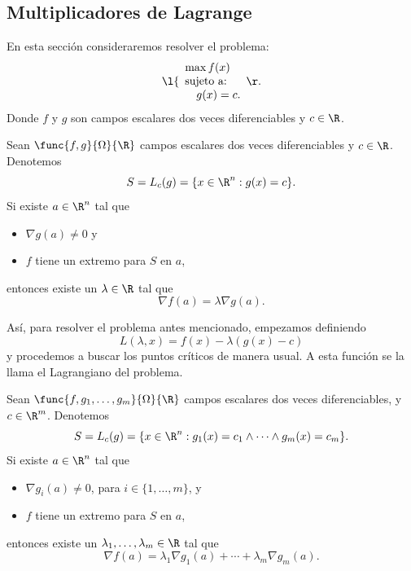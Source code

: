 \documentclass[a4,11pt]{aleph-notas}
\begin{document}
\subsection{Multiplicadores de Lagrange}

En esta sección consideraremos resolver el problema:
\[
    \l\{
    \begin{array}{l}
         \max f(x) \\
         \text{sujeto a:}\\
         \quad g(x)=c.
    \end{array}\r.
\]
Donde $f$ y $g$ son campos escalares dos veces diferenciables y $c\in\R$.
 

\begin{teo}
    Sean $\func{f,g}{\Omega}{\R}$ campos escalares dos veces diferenciables y $c\in \R$. Denotemos 
    \[
        S = L_c(g) = \{x\in \R^n: g(x)=c\}.
    \]
    Si existe $a\in\R^n$ tal que
    \begin{itemize}
        \item $\nabla g(a) \neq 0$ y
        \item $f$ tiene un extremo para $S$ en $a$,
    \end{itemize}
    entonces existe un $\lambda\in\R$ tal que
    \[
        \nabla f(a) = \lambda \nabla g(a).
    \]
\end{teo}
 

Así, para resolver el problema antes mencionado, empezamos definiendo
\[
    L(\lambda,x) = f(x) - \lambda (g(x)-c)
\]
y procedemos a buscar los puntos críticos de manera usual. A esta función se la llama el Lagrangiano del problema.
 

\begin{teo}
    Sean $\func{f,g_1,\ldots,g_m}{\Omega}{\R}$ campos escalares dos veces diferenciables, y $c\in \R^m$. Denotemos 
    \[
        S = L_c(g) = \{x\in \R^n: g_1(x)=c_1\land\cdots\land g_m(x)=c_m\}.
    \]
    Si existe $a\in\R^n$ tal que
    \begin{itemize}
        \item $\nabla g_i(a) \neq 0$, para $i\in\{1,\ldots,m\}$, y
        \item $f$ tiene un extremo para $S$ en $a$,
    \end{itemize}
    entonces existe un $\lambda_1,\ldots,\lambda_m\in\R$ tal que
    \[
        \nabla f(a) = \lambda_1 \nabla g_1(a) + \cdots + \lambda_m \nabla g_m(a).
    \]
\end{teo}
 
\end{document}
